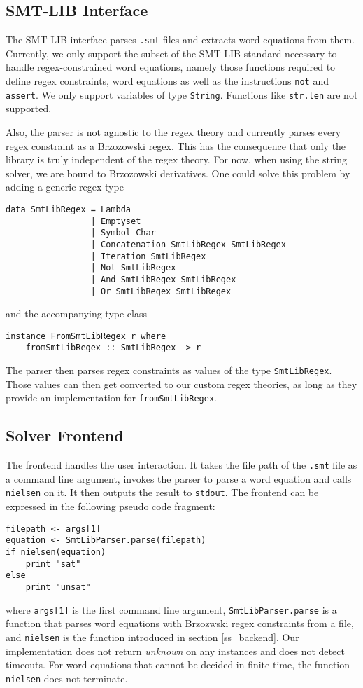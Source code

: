 \subsection{SMT-LIB Interface}
The SMT-LIB interface parses \texttt{.smt} files and extracts word equations from them. Currently, we only support the subset of the SMT-LIB standard necessary to handle regex-constrained word equations, namely those functions required to define regex constraints, word equations as well as the instructions \texttt{not} and \texttt{assert}. We only support variables of type \texttt{String}. Functions like \texttt{str.len} are not supported.

Also, the parser is not agnostic to the regex theory and currently parses every regex constraint as a Brzozowski regex. This has the consequence that only the library is truly independent of the regex theory. For now, when using the string solver, we are bound to Brzozowski derivatives. One could solve this problem by adding a generic regex type
\begin{verbatim}
data SmtLibRegex = Lambda
                 | Emptyset
                 | Symbol Char
                 | Concatenation SmtLibRegex SmtLibRegex
                 | Iteration SmtLibRegex
                 | Not SmtLibRegex
                 | And SmtLibRegex SmtLibRegex
                 | Or SmtLibRegex SmtLibRegex
\end{verbatim}
and the accompanying type class
\begin{verbatim}
instance FromSmtLibRegex r where
    fromSmtLibRegex :: SmtLibRegex -> r
\end{verbatim}
The parser then parses regex constraints as values of the type \texttt{SmtLibRegex}. Those values can then get converted to our custom regex theories, as long as they provide an implementation for \texttt{fromSmtLibRegex}.

\newpage

\subsection{Solver Frontend}
The frontend handles the user interaction. It takes the file path of the \texttt{.smt} file as a command line argument, invokes the parser to parse a word equation and calls \texttt{nielsen} on it. It then outputs the result to \texttt{stdout}. The frontend can be expressed in the following pseudo code fragment:

\begin{verbatim}
filepath <- args[1]
equation <- SmtLibParser.parse(filepath)
if nielsen(equation)
    print "sat"
else
    print "unsat"
\end{verbatim}

where \texttt{args[1]} is the first command line argument, \texttt{SmtLibParser.parse} is a function that parses word equations with Brzozwski regex constraints from a file, and \texttt{nielsen} is the function introduced in section \ref{ss_backend}. Our implementation does not return \textit{unknown} on any instances and does not detect timeouts. For word equations that cannot be decided in finite time, the function \texttt{nielsen} does not terminate.